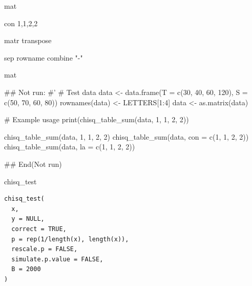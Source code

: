 \documentclass[a4paper]{book}
\begin{document}
%
\begin{Arguments}
\begin{ldescription}
\item[\code{data}] mat

\item[\code{...}] con 1,1,2,2

\item[\code{trans}] matr transpose

\item[\code{sep}] sep rowname combine  "-"
\end{ldescription}
\end{Arguments}
%
\begin{Value}
mat
\end{Value}
%
\begin{Examples}
\begin{ExampleCode}

## Not run: 
#'
# Test data
data <- data.frame(T = c(30, 40, 60, 120),
                   S = c(50, 70, 60, 80))
rownames(data) <- LETTERS[1:4]
data <- as.matrix(data)

# Example usage
print(chisq_table_sum(data, 1, 1, 2, 2))

chisq_table_sum(data, 1, 1, 2, 2)
chisq_table_sum(data, con = c(1, 1, 2, 2))
chisq_table_sum(data, la = c(1, 1, 2, 2))


## End(Not run)



\end{ExampleCode}
\end{Examples}
%
\begin{Description}
chisq\_test
\end{Description}
%
\begin{Usage}
\begin{verbatim}
chisq_test(
  x,
  y = NULL,
  correct = TRUE,
  p = rep(1/length(x), length(x)),
  rescale.p = FALSE,
  simulate.p.value = FALSE,
  B = 2000
)
\end{verbatim}
\end{Usage}
%
\end{document}
